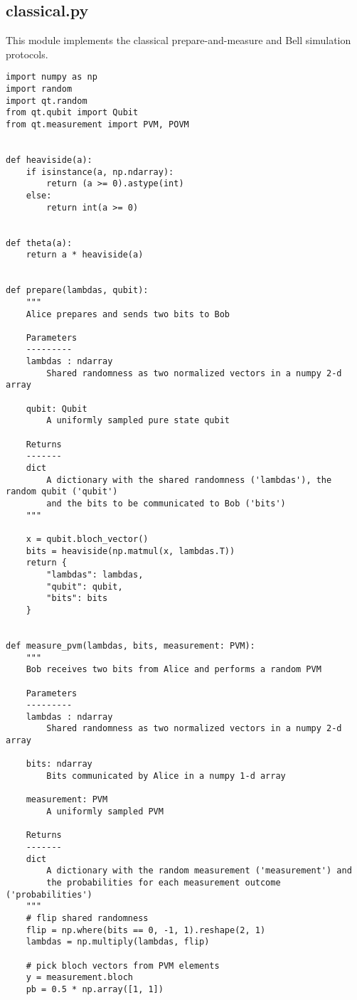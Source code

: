 \subsection{classical.py}\label{section:listings_classical}
This module implements the classical prepare-and-measure and Bell simulation protocols. 
\begin{verbatim}
import numpy as np
import random
import qt.random
from qt.qubit import Qubit
from qt.measurement import PVM, POVM


def heaviside(a):
    if isinstance(a, np.ndarray):
        return (a >= 0).astype(int)
    else:
        return int(a >= 0)


def theta(a):
    return a * heaviside(a)


def prepare(lambdas, qubit):
    """
    Alice prepares and sends two bits to Bob

    Parameters
    ---------
    lambdas : ndarray
        Shared randomness as two normalized vectors in a numpy 2-d array

    qubit: Qubit
        A uniformly sampled pure state qubit

    Returns
    -------
    dict
        A dictionary with the shared randomness ('lambdas'), the random qubit ('qubit')
        and the bits to be communicated to Bob ('bits')
    """

    x = qubit.bloch_vector()
    bits = heaviside(np.matmul(x, lambdas.T))
    return {
        "lambdas": lambdas,
        "qubit": qubit,
        "bits": bits
    }


def measure_pvm(lambdas, bits, measurement: PVM):
    """
    Bob receives two bits from Alice and performs a random PVM

    Parameters
    ---------
    lambdas : ndarray
        Shared randomness as two normalized vectors in a numpy 2-d array

    bits: ndarray
        Bits communicated by Alice in a numpy 1-d array

    measurement: PVM
        A uniformly sampled PVM

    Returns
    -------
    dict
        A dictionary with the random measurement ('measurement') and
        the probabilities for each measurement outcome ('probabilities')
    """
    # flip shared randomness
    flip = np.where(bits == 0, -1, 1).reshape(2, 1)
    lambdas = np.multiply(lambdas, flip)

    # pick bloch vectors from PVM elements
    y = measurement.bloch
    pb = 0.5 * np.array([1, 1])


\end{verbatim}
